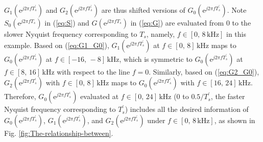 \documentclass [11pt, proquest] {uwthesis}[2020/02/24]
\begin{document}
$G_{1}(\text{e}^{j2\pi fT_{s}^{'}})$ and $G_{2}(\text{e}^{j2\pi fT_{s}^{'}})$
are thus shifted versions of $G_{0}(\text{e}^{j2\pi fT_{s}^{'}})$.
Note $S_{0}(\text{e}^{j2\pi fT_{s}})$ in (\ref{eq:S}) and $G(\text{e}^{j2\pi fT_{s}})$
in (\ref{eq:G}) are evaluated from 0 to the slower Nyquist frequency
corresponding to $T_{s}$, namely, $f\in\left[0,\,8\,\text{kHz}\right]$
in this example. Based on (\ref{eq:G1_G0}), $G_{1}(\text{e}^{j2\pi fT_{s}^{'}})$
at $f\in\left[0,\,8\right]\,\text{kHz}$ maps to $G_{0}(\text{e}^{j2\pi fT_{s}^{'}})$
at $f\in\left[-16,\,-8\right]\,\text{kHz}$, which is symmetric to
$G_{0}(\text{e}^{j2\pi fT_{s}^{'}})$ at $f\in\left[8,\,16\right]\,\text{kHz}$
with respect to the line $f=0$. Similarly, based on (\ref{eq:G2_G0}),
$G_{2}(\text{e}^{j2\pi fT_{s}^{'}})$ with $f\in\left[0,\,8\right]\,\text{kHz}$
maps to $G_{0}(\text{e}^{j2\pi fT_{s}^{'}})$ with $f\in\left[16,\,24\right]\,\text{kHz}$.
Therefore, $G_{0}(\text{e}^{j2\pi fT_{s}^{'}})$ evaluated at $f\in\left[0,\,24\right]\,\text{kHz}$
(0 to $0.5/T_{s}^{'}$, the faster Nyquist frequency corresponding
to $T_{s}^{'}$) includes all the desired information of $G_{0}(\text{e}^{j2\pi fT_{s}^{'}})$,
$G_{1}(\text{e}^{j2\pi fT_{s}^{'}})$, and $G_{2}(\text{e}^{j2\pi fT_{s}^{'}})$
under $f\in\left[0,\,8\,\text{kHz}\right]$, as shown in Fig. \ref{fig:The-relationship-between}. 
\end{document}
